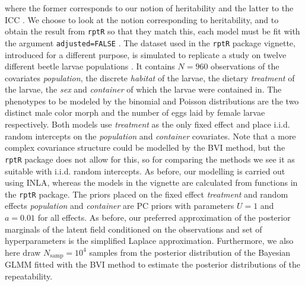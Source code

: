 where the former corresponds to our notion of heritability \citep{Stoffel2017rptR} and the latter to the ICC \citep{GLMM_book}. We choose to look at the notion corresponding to heritability, and to obtain the result from \texttt{rptR} so that they match this, each model must be fit with the argument \texttt{adjusted=FALSE} \citep{Stoffel2017rptR}. The dataset used in the \texttt{rptR} package vignette, introduced for a different purpose, is simulated to replicate a study on twelve different beetle larvae populations \citep{Stoffel2017rptR}. It contains $N=960$ observations of the covariates \textit{population}, the discrete \textit{habitat} of the larvae, the dietary \textit{treatment} of the larvae, the \textit{sex} and \textit{container} of which the larvae were contained in. The phenotypes to be modeled by the binomial and Poisson distributions are the two distinct male color morph and the number of eggs laid by female larvae respectively. Both models use \textit{treatment} as the only fixed effect and place i.i.d. random intercepts on the \textit{population} and \textit{container} covariates. Note that a more complex covariance structure could be modelled by the BVI method, but the \texttt{rptR} package does not allow for this, so for comparing the methods we see it as suitable with i.i.d. random intercepts. As before, our modelling is carried out using INLA, whereas the models in the vignette are calculated from functions in the \texttt{rptR} package. The priors placed on the fixed effect \textit{treatment} and random effects \textit{population} and \textit{container} are PC priors with parameters $U=1$ and $a=0.01$ for all effects. As before, our preferred approximation of the posterior marginals of the latent field conditioned on the observations and set of hyperparameters is the simplified Laplace approximation. Furthermore, we also here draw $N_{\text{samp}}=10^4$ samples from the posterior distribution of the Bayesian GLMM fitted with the BVI method to estimate the posterior distributions of the repeatability. 


